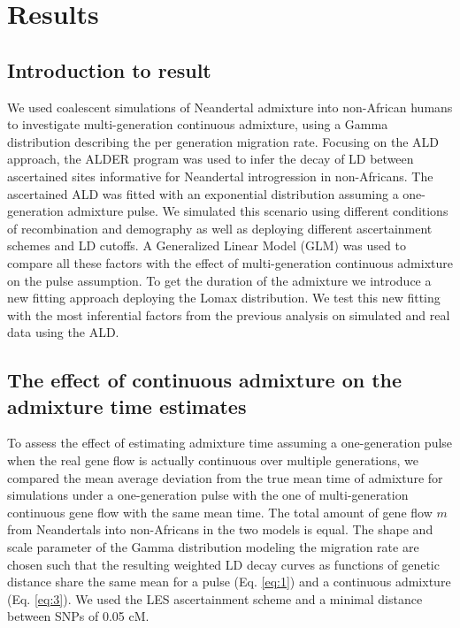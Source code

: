 \documentclass[]{article}
\begin{document}
\section{Results}\label{results}

\subsection{Introduction to result}\label{introduction to result}

We used coalescent simulations of Neandertal admixture into non-African humans to investigate multi-generation continuous admixture, using a Gamma distribution describing the per generation migration rate. Focusing on the ALD approach, the ALDER program was used to infer the decay of LD between ascertained sites informative for Neandertal introgression in non-Africans. The ascertained ALD was fitted with an exponential distribution assuming a one-generation admixture pulse.  We simulated this scenario using different conditions of recombination and demography as well as deploying different ascertainment schemes and LD cutoffs. A Generalized Linear Model (GLM) was used to compare all these factors with the effect of multi-generation continuous admixture on the pulse assumption. To get the duration of the admixture we introduce a new fitting approach deploying the Lomax distribution. We test this new fitting with the most inferential factors from the previous analysis on simulated and real data using the ALD.


\subsection{The effect of continuous admixture on the admixture time estimates}\label{the effect of continuous admixture on the admixture time estimates}


To assess the effect of estimating admixture time assuming a one-generation pulse when the real gene flow is actually continuous over multiple generations,
we compared the mean average deviation from the true mean time of admixture for simulations under a one-generation pulse with the one of multi-generation continuous gene flow with the same mean time.
The total amount of gene flow \(m\) from Neandertals into non-Africans
in the two models is equal. 
The shape and scale parameter of the Gamma distribution modeling the migration rate are chosen such
that the resulting weighted LD decay curves as functions of genetic
distance share the same mean for a pulse (Eq. \ref{eq:1}) and a
continuous admixture (Eq. \ref{eq:3}). We used the LES ascertainment scheme and a minimal distance between SNPs of 0.05 cM. 
\end{document}
